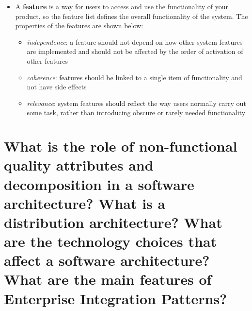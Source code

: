 \begin{itemize}

   \item A \textbf{feature} is a way for users to access and use the functionality of your product, so the feature list defines the overall functionality of the system. The properties of the features are shown below:
         \begin{itemize}
            \item \textit{independence}: a feature should not depend on how other system features are implemented and should not be affected by the order of activation of other features
            \item \textit{coherence}: features should be linked to a single item of functionality and not have side effects
            \item \textit{relevance}: system features should reflect the way users normally carry out some task, rather than introducing obscure or rarely needed functionality
         \end{itemize}
\end{itemize}


\section{What is the role of non-functional quality attributes and decomposition in a software architecture? What is a distribution architecture? What are the technology choices that affect a software architecture? What are the main features of Enterprise Integration Patterns?}
